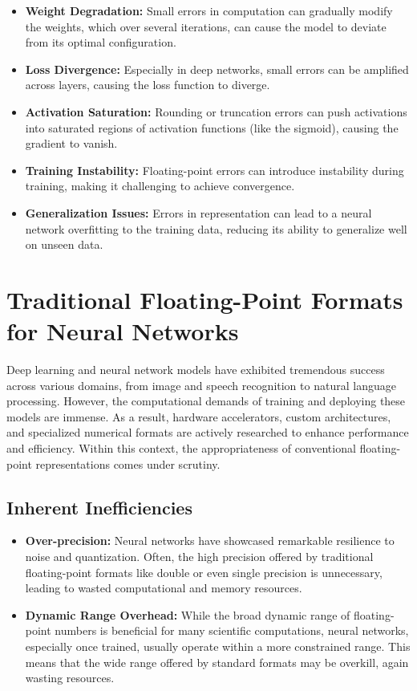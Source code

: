 \begin{itemize}
	\item \textbf{Weight Degradation:} Small errors in computation can gradually modify the weights, which over several iterations, can cause the model to deviate from its optimal configuration.
	
	\item \textbf{Loss Divergence:} Especially in deep networks, small errors can be amplified across layers, causing the loss function to diverge.
	
	\item \textbf{Activation Saturation:} Rounding or truncation errors can push activations into saturated regions of activation functions (like the sigmoid), causing the gradient to vanish.
	
	\item \textbf{Training Instability:} Floating-point errors can introduce instability during training, making it challenging to achieve convergence.
	
	\item \textbf{Generalization Issues:} Errors in representation can lead to a neural network overfitting to the training data, reducing its ability to generalize well on unseen data.
\end{itemize}

\section{Traditional Floating-Point Formats for Neural Networks}

Deep learning and neural network models have exhibited tremendous success across various domains, from image and speech recognition to natural language processing. However, the computational demands of training and deploying these models are immense. As a result, hardware accelerators, custom architectures, and specialized numerical formats are actively researched to enhance performance and efficiency. Within this context, the appropriateness of conventional floating-point representations comes under scrutiny.

\subsection{Inherent Inefficiencies}

\begin{itemize}
	\item \textbf{Over-precision:} Neural networks have showcased remarkable resilience to noise and quantization. Often, the high precision offered by traditional floating-point formats like double or even single precision is unnecessary, leading to wasted computational and memory resources.
	
	\item \textbf{Dynamic Range Overhead:} While the broad dynamic range of floating-point numbers is beneficial for many scientific computations, neural networks, especially once trained, usually operate within a more constrained range. This means that the wide range offered by standard formats may be overkill, again wasting resources.
\end{itemize}

